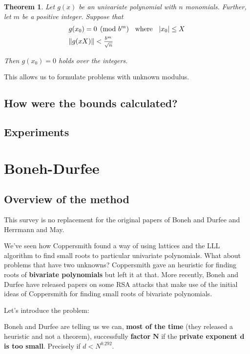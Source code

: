 \documentclass[a4paper,11pt]{article}
\newtheorem{theorem}{Theorem}
\begin{document}
\begin{theorem}
Let $g(x)$ be an univariate polynomial with $n$ monomials. Further, let $m$ be a positive integer. Suppose that
\setcounter{equation}{0}
\begin{align}
&g(x_0) = 0 \pmod{b^m} \hspace{2mm} \text{ where } \hspace{2mm} |x_0| \leq X\\
&\|g(xX)\| < \frac{_{b^m}}{^{\sqrt{n}}}
\end{align}

Then $g(x_0)=0$ holds over the integers.
\end{theorem}

This allows us to formulate problems with unknown modulus.

\subsection{How were the bounds calculated?}\label{bounds}

\subsection{Experiments}\label{coppersmith-experiments}

\section{Boneh-Durfee}\label{bonehdurfee}

\subsection{Overview of the method}\label{overview}
This survey is no replacement for the original papers of Boneh and Durfee\cite{bonehdurfee} and Herrmann and May\cite{herrmannmay}.

We've seen how Coppersmith found a way of using lattices and the LLL algorithm to find small roots to particular univariate polynomials. What about problems that have two unknowns? Coppersmith gave an heuristic for finding roots of \textbf{bivariate polynomials} but left it at that. More recently, Boneh and Durfee have released papers on some RSA attacks that make use of the initial ideas of Coppersmith for finding small roots of bivariate polynomials.

Let's introduce the problem:

Boneh and Durfee are telling us we can, \textbf{most of the time} (they released a heuristic and not a theorem), successfully \textbf{factor} $\textbf{N}$ if the \textbf{private exponent $\textbf{d}$ is too small}. Precisely if $d < N^{0.292}$.\\
\end{document}
